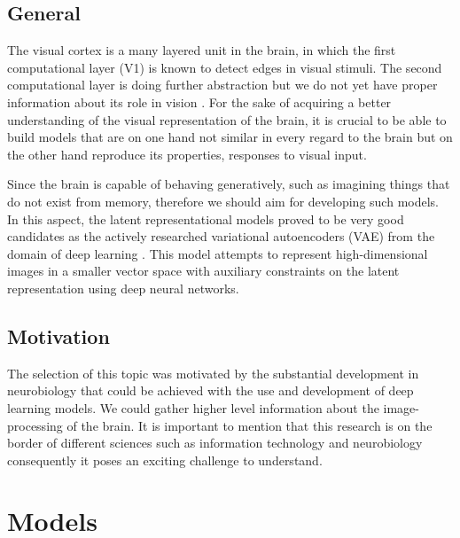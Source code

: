 \documentclass[11pt, english]{article}
\begin{document}
\subsection{General}

\vspace{5mm}

\par  The visual cortex is a many layered unit in the brain, in which the first computational layer (V1) is known to detect edges in visual stimuli.
The second computational layer is doing further abstraction but we do not yet
have proper information about its role in vision \cite{ZiembaV2}. For the sake of acquiring a
better understanding of the visual representation of the brain, it is crucial to be able to build models that are on one hand not similar in every regard to the brain but on the other hand reproduce its properties, responses to visual input.

\vspace{3mm}

\par Since the brain is capable of behaving generatively, such as imagining things that do not exist from memory, therefore we should aim for developing such models. In this aspect, the latent representational models proved to be very good candidates as the actively researched variational autoencoders (VAE) from the domain of deep learning \cite{kingma2013auto}. This model attempts to represent high-dimensional images in a smaller vector space with auxiliary constraints on the latent representation using deep neural networks.

\subsection{Motivation}

\vspace{5mm}

\par The selection of this topic was motivated by the substantial development in neurobiology that could be achieved with the use and development of deep learning models. We could gather higher level information about the image-processing of the brain. It is important to mention that this research is on the border of different sciences such as information technology and neurobiology consequently it poses an exciting challenge to understand.

\newpage

\section{Models}
\end{document}
